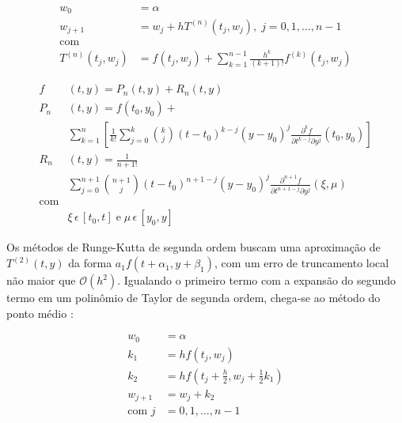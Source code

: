 \documentclass[final,5p]{elsarticle}
\numberwithin{equation}{section}
\begin{document}
        \begin{subequations} \label{eq:taylorn}
        \begin{align}
            w_0 &= \alpha \nonumber \\
            w_{j+1} &= w_j + h T^{(n)}(t_j,w_j), \; j=0,1,\ldots,n-1 \\
            \text{com}& \nonumber \\
            T^{(n)}(t_j,w_j) &= f(t_j,w_j) + \sum_{k=1}^{n-1}\frac{h^k}{(k+1)!}f^{(k)}(t_j,w_j)
        \end{align}
        \end{subequations}

        \begin{subequations} \label{eq:taylorduasvar}
        \begin{align}
            f&(t,y) = P_n(t,y) + R_n(t,y) \\
            P_n&(t,y) = f(t_0,y_0) + \nonumber \\
            &\sum_{k = 1}^{n} \left[ \frac{1}{k!} \sum_{j = 0}^{k} \binom{k}{j} (t-t_0)^{k-j}(y-y_0)^j\frac{\partial^kf}{\partial t^{k-j} \partial y^j}(t_0,y_0) \right] \\
            R_n&(t,y) = \frac{1}{n+1!} \nonumber \\
            &\sum_{j = 0}^{n+1} \binom{n+1}{j} (t-t_0)^{n+1-j}(y-y_0)^j\frac{\partial^{n+1}f}{\partial t^{n+1-j} \partial y^j}(\xi,\mu) \\
            \text{com}& \nonumber \\
            &\xi \, \epsilon \, [t_0,t] \; \text{e} \; \mu  \, \epsilon \, [y_0,y] \nonumber
        \end{align}
        \end{subequations}

        Os métodos de Runge-Kutta de segunda ordem buscam uma aproximação de $T^{(2)}(t,y)$ da forma $a_1f(t+\alpha_1,y+\beta_1)$, com um erro de truncamento local não maior que $\mathcal{O}(h^2)$. Igualando o primeiro termo com a expansão do segundo termo em um polinômio de Taylor de segunda ordem, chega-se ao método do ponto médio \cite{burden2016analise}:

        \begin{align}
            w_0 &= \alpha \nonumber \\
            k_1 &= hf\left(t_j,w_j\right) \nonumber \\
            k_2 &= hf\left(t_j+\frac{h}{2},w_j+\frac{1}{2}k_1\right) \nonumber \\
            w_{j+1} &= w_{j} + k_2 \label{eq:pontomedio} \\
            \text{com } j&=0,1,\ldots,n-1 \nonumber
        \end{align}
\end{document}
